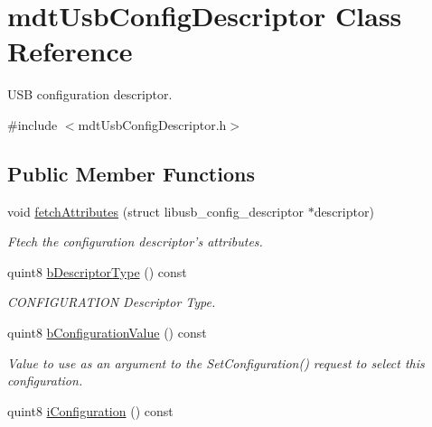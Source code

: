 \hypertarget{classmdt_usb_config_descriptor}{
\section{mdtUsbConfigDescriptor Class Reference}
\label{classmdt_usb_config_descriptor}
}


USB configuration descriptor.  




{\ttfamily \#include $<$mdtUsbConfigDescriptor.h$>$}

\subsection*{Public Member Functions}
\begin{DoxyCompactItemize}
\item 
void \hyperlink{classmdt_usb_config_descriptor_acece47193e1ab7184894082a40233f45}{fetchAttributes} (struct libusb\_\-config\_\-descriptor $\ast$descriptor)
\begin{DoxyCompactList}\small\item\em Ftech the configuration descriptor's attributes. \end{DoxyCompactList}\item 
\hypertarget{classmdt_usb_config_descriptor_a7bac684b7862455bad66189a2ce9603b}{
quint8 \hyperlink{classmdt_usb_config_descriptor_a7bac684b7862455bad66189a2ce9603b}{bDescriptorType} () const }
\label{classmdt_usb_config_descriptor_a7bac684b7862455bad66189a2ce9603b}

\begin{DoxyCompactList}\small\item\em CONFIGURATION Descriptor Type. \end{DoxyCompactList}\item 
\hypertarget{classmdt_usb_config_descriptor_ab61472d4050abb29a4815e194869ea88}{
quint8 \hyperlink{classmdt_usb_config_descriptor_ab61472d4050abb29a4815e194869ea88}{bConfigurationValue} () const }
\label{classmdt_usb_config_descriptor_ab61472d4050abb29a4815e194869ea88}

\begin{DoxyCompactList}\small\item\em Value to use as an argument to the SetConfiguration() request to select this configuration. \end{DoxyCompactList}\item 
\hypertarget{classmdt_usb_config_descriptor_a37b48b43509d4575d2dd714e745db57b}{
quint8 \hyperlink{classmdt_usb_config_descriptor_a37b48b43509d4575d2dd714e745db57b}{iConfiguration} () const }
\label{classmdt_usb_config_descriptor_a37b48b43509d4575d2dd714e745db57b}


\end{DoxyCompactItemize}
